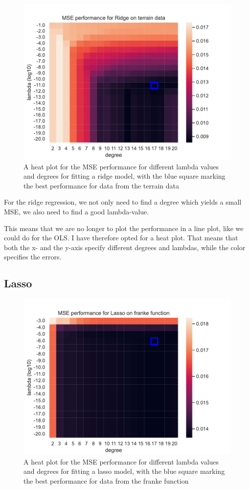 \documentclass[12pt]{article}
\begin{document}
\begin{figure}[H]
    \centering
    \includegraphics[width=0.7\columnwidth]{../src/output/mse_heat_plot_terrain_data_Ridge.pdf}
    \caption{A heat plot for the MSE performance for different lambda values and degrees for fitting a ridge model, with the blue square marking the best performance for data from the terrain data}
    \label{fig:mse_heat_map_terrain_ridge}
\end{figure}

For the ridge regression, we not only need to find a degree which yields a small MSE, we also need to find a good lambda-value.

This means that we are no longer to plot the performance in a line plot, like we could do for the OLS.
I have therefore opted for a heat plot. That means that both the x- and the y-axis specify different degrees and lambdas, while the color specifies the errors.


\subsection{Lasso}

\begin{figure}[H]
    \centering
    \includegraphics[width=0.65\columnwidth]{../src/output/mse_heat_plot_franke_function_Lasso.pdf}
    \caption{A heat plot for the MSE performance for different lambda values and degrees for fitting a lasso model, with the blue square marking the best performance for data from the franke function}
    \label{fig:mse_heat_map_franke_lasso}
\end{figure}
\end{document}
